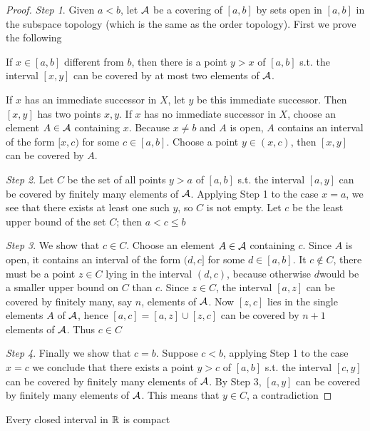 \documentclass[11pt]{article}
\begin{document}
\begin{proof}
\emph{Step 1}. Given \(a<b\), let \(\mathcal{A}\) be a covering of \([a,b]\) by sets open in \([a,b]\) in the
subspace topology (which is the same as the order topology). First we prove the following
\begin{quoting}
If \(x\in[a,b]\) different from \(b\), then there is a point \(y>x\) of \([a,b]\) s.t. the interval \([x,y]\) can
be covered by at most two elements of \(\mathcal{A}\).
\end{quoting}

If \(x\) has an immediate successor in \(X\), let \(y\) be this immediate successor.
Then \([x,y]\) has two points \(x,y\). If \(x\) has no immediate successor in \(X\), choose an
element \(A\in\mathcal{A}\) containing \(x\). Because \(x\neq b\) and \(A\) is open, \(A\) contains an interval
of the form \([x,c)\) for some \(c\in[a,b]\). Choose a point \(y\in(x,c)\), then \([x,y]\) can be
covered by \(A\).

\emph{Step 2}. Let \(C\) be the set of all points \(y>a\) of \([a,b]\) s.t. the interval \([a,y]\) can
be covered by finitely many elements of \(\mathcal{A}\). Applying Step 1 to the case \(x=a\), we see that
there exists at least one such \(y\), so \(C\) is not empty. Let \(c\) be the least upper bound
of the set \(C\); then \(a<c\le b\)

\emph{Step 3}. We show that \(c\in C\). Choose an element \(A\in\mathcal{A}\) containing \(c\). Since \(A\) is open,
it contains an interval of the form \((d,c]\) for some \(d\in[a,b]\). It \(c\not\in C\), there must
be a point \(z\in C\) lying in the interval \((d,c)\), because otherwise \(d\)would be a smaller
upper bound on \(C\) than \(c\). Since \(z\in C\), the interval \([a,z]\) can be covered by
finitely many, say \(n\), elements of \(\mathcal{A}\). Now \([z,c]\) lies in the single elements \(A\)
of \(\mathcal{A}\), hence \([a,c]=[a,z]\cup[z,c]\) can be covered by \(n+1\) elements of \(\mathcal{A}\). Thus \(c\in C\)

\emph{Step 4}. Finally we show that \(c=b\). Suppose \(c<b\), applying Step 1 to the case \(x=c\) we
conclude that there exists a point \(y>c\) of \([a,b]\) s.t. the interval \([c,y]\) can be
covered by finitely many elements of \(\mathcal{A}\).  By Step 3, \([a,y]\) can be covered by finitely many
elements of \(\mathcal{A}\). This means that \(y\in C\), a contradiction
\end{proof}

\begin{corollary}[]
Every closed interval in \(\mathbb{R}\) is compact
\end{corollary}
\end{document}
